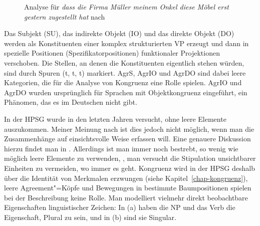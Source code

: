 \begin{figure}
\caption{\label{fig-konstituentenstellung-meinunger}Analyse für \emph{dass die Firma Müller meinem Onkel diese Möbel erst gestern zugestellt hat} 
nach }
\end{figure}
Das Subjekt (SU), das indirekte Objekt (IO) und das direkte Objekt (DO) werden als Konstituenten
einer komplex strukturierten VP erzeugt und dann in spezielle Positionen (Spezifikatorpositionen)
funktionaler Projektionen verschoben. Die Stellen, an denen die Konstituenten eigentlich stehen würden,
sind durch Spuren (t, t, t) markiert. AgrS, AgrIO und AgrDO sind dabei leere
Kategorien, die für die Analyse von Kongruenz eine Rolle spielen. AgrIO und
AgrDO wurden ursprünglich für Sprachen mit Objektkongruenz eingeführt, ein
Phänomen, das es im Deutschen nicht gibt.


In der HPSG wurde in den letzten Jahren versucht, ohne leere Elemente auszukommen. Meiner Meinung
nach ist dies jedoch nicht möglich, wenn man die Zusammenhänge auf einsichtsvolle Weise erfassen
will. Eine genauere Diskussion hierzu findet man in . Allerdings ist man immer
noch bestrebt, so wenig wie möglich leere Elemente zu verwenden, \dash, man versucht die Stipulation
unsichtbarer Einheiten zu vermeiden, wo immer es geht.
Kongruenz wird in der HPSG deshalb über die Identität von Merkmalen erzwungen (siehe
Kapitel~\ref{chap-kongruenz}), leere Agreement"=Köpfe und Bewegungen in bestimmte Baumpositionen
spielen bei der Beschreibung keine Rolle.  Man modelliert vielmehr direkt beobachtbare Eigenschaften
linguistischer Zeichen: In (a) haben die NP und das Verb die Eigenschaft, Plural zu sein, und
in (b) sind sie Singular.

